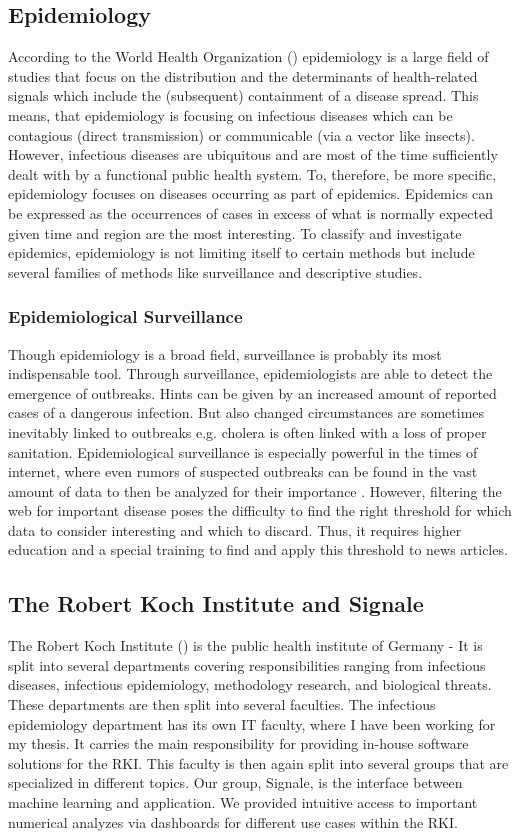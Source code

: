 \subsection{Epidemiology}
According to the World Health Organization () \cite{WHOepi} epidemiology is a large field of studies that focus
on the distribution and the determinants of health-related signals which include the (subsequent)
containment of a disease spread. This means, that epidemiology is focusing on infectious diseases which can be contagious (direct transmission) or communicable (via a vector like insects). However, infectious diseases are ubiquitous and are most of the time sufficiently dealt with by a functional public health system. To, therefore, be more specific, epidemiology focuses on diseases occurring as part of epidemics. Epidemics can be expressed as the occurrences of cases in excess of what is normally expected
given time and region are the most interesting. To classify and investigate epidemics, epidemiology is not limiting itself to certain methods but include several families of methods like surveillance and descriptive studies.

\subsubsection{Epidemiological Surveillance}

Though epidemiology is a broad field, surveillance is probably its most indispensable tool. Through surveillance,
epidemiologists are able to detect the emergence of outbreaks. Hints can be given by an increased amount of reported cases of a dangerous infection. But also changed circumstances are sometimes inevitably linked to outbreaks e.g. cholera is often linked with a loss of proper sanitation. Epidemiological surveillance is especially powerful in the times of internet, where even rumors of suspected outbreaks can be found in the vast amount of data to then be analyzed for their importance \cite{EpiSurv}. However, filtering the web for important disease poses the difficulty to find the right threshold for which data to consider interesting and which to discard. Thus, it requires higher education and a special training to find and apply this threshold to
news articles.

\subsection{The Robert Koch Institute and Signale}
The Robert Koch Institute () is the public health institute of Germany - It is
split into several departments covering responsibilities ranging from infectious diseases, infectious epidemiology, methodology research, and biological threats.
These departments are then split into several faculties. The infectious epidemiology department has its own IT faculty,
where I have been working for my thesis. It carries the main responsibility for providing in-house software solutions for the RKI. This faculty is then again split into several groups that are specialized in different topics.
Our group, Signale, is the interface between machine learning and application.
We provided intuitive access to important numerical analyzes via dashboards for different use cases within the RKI.

